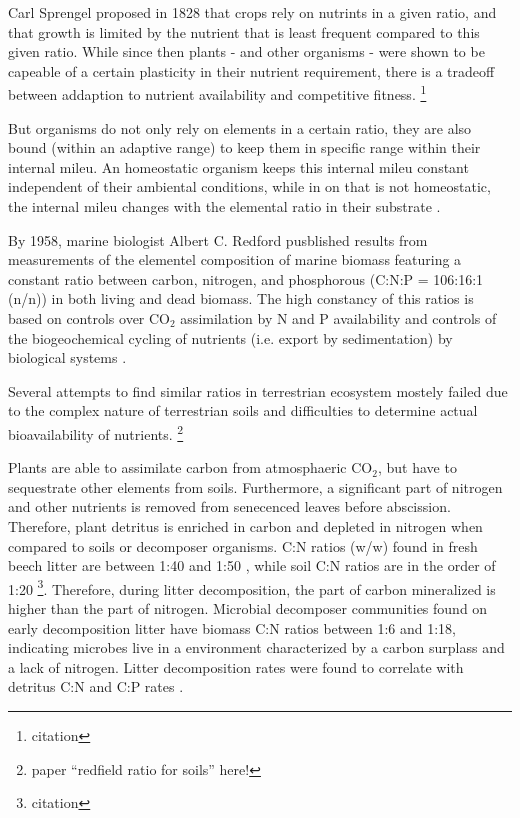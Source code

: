 Carl Sprengel proposed in 1828 that crops rely on nutrints in a given ratio, and that growth is limited by the nutrient that is least frequent compared to this given ratio. While since then plants - and other organisms - were shown to be capeable of a certain plasticity in their nutrient requirement, there is a tradeoff between addaption to nutrient availability and competitive fitness. \footnote{citation}

But organisms do not only rely on elements in a certain ratio, they are also bound (within an adaptive range) to keep them in specific range within their internal mileu. An homeostatic organism keeps this internal mileu constant independent of their ambiental conditions, while in on that is not homeostatic, the internal mileu changes with the elemental ratio in their substrate \citep{Sterner2002}. 

By 1958, marine biologist Albert C. Redford pusblished results from measurements of the elementel composition of marine biomass featuring a constant ratio between carbon, nitrogen, and phosphorous (C:N:P = 106:16:1 (n/n)) in both living and dead biomass. The high constancy of this ratios is based on controls over CO$_2$ assimilation by N and P availability and controls of the  biogeochemical cycling of nutrients (i.e. export by sedimentation) by biological systems \citep{Cleveland2007}. 

Several attempts to find similar ratios in terrestrian ecosystem mostely failed due to the complex nature of terrestrian soils and difficulties to determine actual bioavailability of nutrients. \footnote{paper “redfield ratio for soils” here!}

Plants are able to assimilate carbon from atmosphaeric CO$_2$, but have to sequestrate other elements from soils. Furthermore, a significant part of nitrogen and other nutrients is removed from senecenced leaves before abscission. Therefore, plant detritus is enriched in carbon and depleted in nitrogen when compared to soils or decomposer organisms. C:N ratios (w/w) found in fresh beech litter are between 1:40 and 1:50 \citep{Mooshammer2011}, while soil C:N ratios are in the order of 1:20 \footnote{citation}. Therefore, during litter decomposition, the part of carbon mineralized is higher than the part of nitrogen. Microbial decomposer communities found on early decomposition litter have biomass C:N ratios between 1:6 and 1:18, indicating microbes live in a environment characterized by a carbon surplass and a lack of nitrogen. Litter decomposition rates were found to correlate with detritus C:N and C:P rates \citep{Enriquez1993}.

